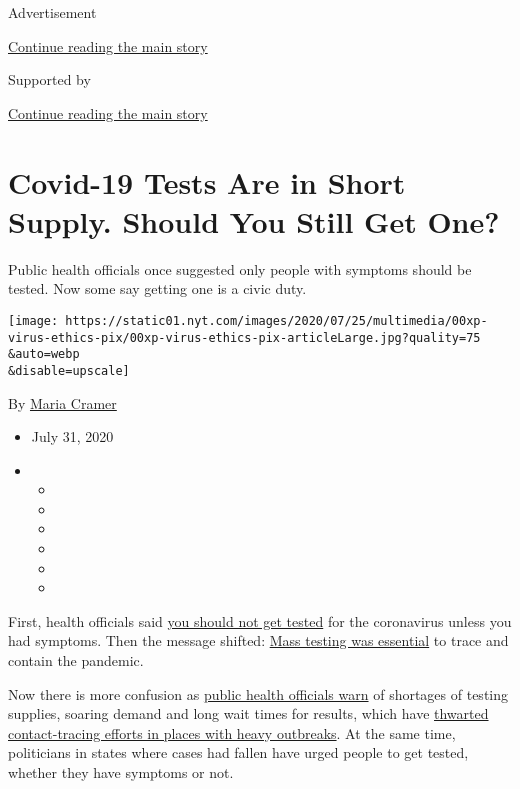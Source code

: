 Advertisement

\protect\hyperlink{after-top}{Continue reading the main story}

Supported by

\protect\hyperlink{after-sponsor}{Continue reading the main story}

\hypertarget{covid-19-tests-are-in-short-supply-should-you-still-get-one}{%
\section{Covid-19 Tests Are in Short Supply. Should You Still Get
One?}\label{covid-19-tests-are-in-short-supply-should-you-still-get-one}}

Public health officials once suggested only people with symptoms should
be tested. Now some say getting one is a civic duty.

\texttt{[image: https://static01.nyt.com/images/2020/07/25/multimedia/00xp-virus-ethics-pix/00xp-virus-ethics-pix-articleLarge.jpg?quality=75\\\&auto=webp\\\&disable=upscale]}

By \href{https://www.nytimes.com/by/maria-cramer}{Maria Cramer}

\begin{itemize}
\item
  July 31, 2020
\item
  \begin{itemize}
  \item
  \item
  \item
  \item
  \item
  \item
  \end{itemize}
\end{itemize}

First, health officials said
\href{https://www.washingtonpost.com/health/2020/03/21/coronavirus-testing-strategyshift/}{you
should not get tested} for the coronavirus unless you had symptoms. Then
the message shifted:
\href{https://www.nytimes.com/2020/07/01/health/coronavirus-pooled-testing.html}{Mass
testing was essential} to trace and contain the pandemic.

Now there is more confusion as
\href{https://www.nytimes.com/2020/07/23/health/coronavirus-testing-supply-shortage.html}{public
health officials warn} of shortages of testing supplies, soaring demand
and long wait times for results, which have
\href{https://www.nytimes.com/2020/07/31/health/covid-contact-tracing-tests.html}{thwarted
contact-tracing efforts in places with heavy outbreaks}. At the same
time, politicians in states where cases had fallen have urged people to
get tested, whether they have symptoms or not.

